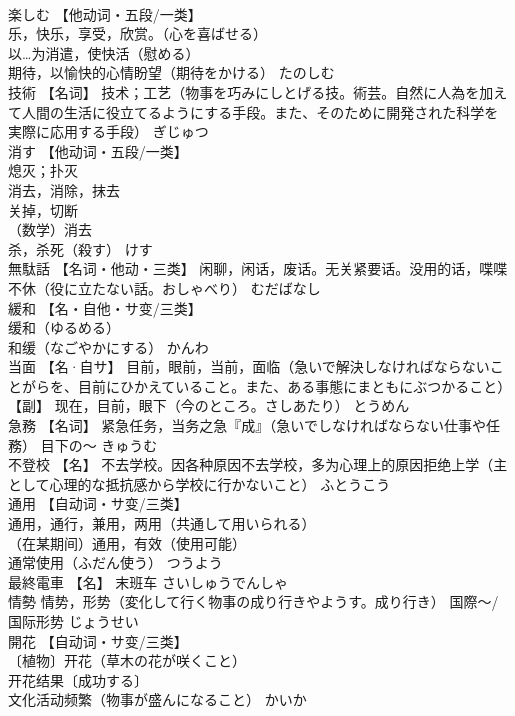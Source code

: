 \documentclass[8pt]{extreport}
\begin{document}
\begin{CJK}{UTF8}{min}
\\	楽しむ	【他动词・五段/一类】 
\\	乐，快乐，享受，欣赏。（心を喜ばせる） 
\\	以…为消遣，使快活（慰める） 
\\	期待，以愉快的心情盼望（期待をかける）	たのしむ	
\\	技術	【名词】 技术；工艺（物事を巧みにしとげる技。術芸。自然に人為を加えて人間の生活に役立てるようにする手段。また、そのために開発された科学を実際に応用する手段）	ぎじゅつ	
\\	消す	【他动词・五段/一类】 
\\	熄灭；扑灭 
\\	消去，消除，抹去 
\\	关掉，切断 
\\	（数学）消去 
\\	杀，杀死（殺す）	けす	
\\	無駄話	【名词・他动・三类】 闲聊，闲话，废话。无关紧要话。没用的话，喋喋不休（役に立たない話。おしゃべり）	むだばなし	
\\	緩和	【名・自他・サ变/三类】 
\\	缓和（ゆるめる） 
\\	和缓（なごやかにする）	かんわ	
\\	当面	【名·自サ】 目前，眼前，当前，面临（急いで解決しなければならないことがらを、目前にひかえていること。また、ある事態にまともにぶつかること） 【副】 现在，目前，眼下（今のところ。さしあたり）	とうめん	
\\	急務	【名词】 紧急任务，当务之急『成』（急いでしなければならない仕事や任務） 目下の〜	きゅうむ	
\\	不登校	【名】 不去学校。因各种原因不去学校，多为心理上的原因拒绝上学（主として心理的な抵抗感から学校に行かないこと）	ふとうこう	
\\	通用	【自动词・サ变/三类】 
\\	通用，通行，兼用，两用（共通して用いられる） 
\\	（在某期间）通用，有效（使用可能） 
\\	通常使用（ふだん使う）	つうよう	
\\	最終電車	【名】 末班车	さいしゅうでんしゃ	
\\	情勢	情势，形势（変化して行く物事の成り行きやようす。成り行き） 国際～/国际形势	じょうせい	
\\	開花	【自动词・サ变/三类】 
\\	〔植物〕开花（草木の花が咲くこと） 
\\	开花结果〔成功する〕 
\\	文化活动频繁（物事が盛んになること）	かいか	

\end{CJK}
\end{document}
